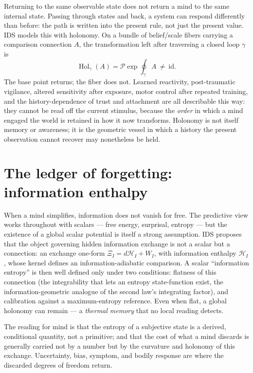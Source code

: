\documentclass[11pt,a4paper]{article}
\theoremstyle{plain}
\begin{document}
Returning to the same observable state does not return a mind to the same internal state. Passing through
states and back, a system can respond differently than before: the path is written into the present rule,
not just the present value. IDS models this with holonomy. On a bundle of belief/scale fibers carrying a
comparison connection $A$, the transformation left after traversing a closed loop $\gamma$ is
\begin{equation}
\operatorname{Hol}_\gamma(A)=\mathcal P\exp\!\oint_\gamma A\ \ne\ \mathrm{id}.
\end{equation}
The base point returns; the fiber does not. Learned reactivity, post-traumatic vigilance, altered
sensitivity after exposure, motor control after repeated training, and the history-dependence of trust
and attachment are all describable this way: they cannot be read off the current stimulus, because the
\emph{order} in which a mind engaged the world is retained in how it now transforms. Holonomy is not
itself memory or awareness; it is the geometric vessel in which a history the present observation cannot
recover may nonetheless be held.

\section{The ledger of forgetting: information enthalpy}\label{sec:enthalpy}

When a mind simplifies, information does not vanish for free. The predictive view works throughout with
scalars --- free energy, surprisal, entropy --- but the existence of a global scalar potential is itself
a strong assumption. IDS proposes that the object governing hidden information exchange is not a scalar
but a connection: an exchange one-form $\Xi_I=d\mathcal H_I+W_I$, with information enthalpy
$\mathcal H_I$, whose kernel defines an information-adiabatic comparison. A scalar ``information
entropy'' is then well defined only under two conditions: flatness of this connection (the
integrability that lets an entropy state-function exist, the information-geometric analogue of the second
law's integrating factor), and calibration against a maximum-entropy reference. Even when flat, a global
holonomy can remain --- a \emph{thermal memory} that no local reading detects.

The reading for mind is that the entropy of a subjective state is a derived, conditional quantity, not a
primitive; and that the cost of what a mind discards is generally carried not by a number but by the
curvature and holonomy of this exchange. Uncertainty, bias, symptom, and bodily response are where the
discarded degrees of freedom return.
\end{document}
